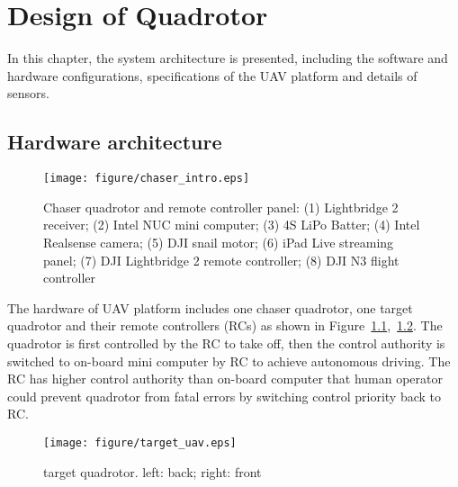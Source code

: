 \chapter{Design of Quadrotor}\label{design}

In this chapter, the system architecture is presented, including the software and hardware configurations, specifications of the UAV platform and details of sensors.

\section{Hardware architecture}\label{hardware}

\begin{figure}[ht]
  \centering
  \texttt{[image: figure/chaser\_intro.eps]}
  \caption{Chaser quadrotor and remote controller panel: (1) Lightbridge 2 receiver; (2) Intel NUC mini computer; (3) 4S LiPo Batter; (4) Intel Realsense camera; (5) DJI snail motor; (6) iPad Live streaming panel; (7) DJI Lightbridge 2 remote controller; (8) DJI N3 flight controller}
  \label{fig:quadrotor_controller}
\end{figure}

The hardware of UAV platform includes one chaser quadrotor, one target quadrotor and their remote controllers (RCs) as shown in Figure~\ref{fig:quadrotor_controller},~\ref{fig:target_uav}. The quadrotor is first controlled by the RC to take off, then the control authority is switched to on-board mini computer by RC to achieve autonomous driving. The RC has higher control authority than on-board computer that human operator could prevent quadrotor from fatal errors by switching control priority back to RC.

\begin{figure}[ht]
  \centering
  \texttt{[image: figure/target\_uav.eps]}
  \caption{target quadrotor. left: back; right: front}
  \label{fig:target_uav}
\end{figure}

\begin{table}[htb]
  \centering
  \caption{Weight and power consumption of components on the quadrotor}
  \label{tb:weight_power}
\end{table}

